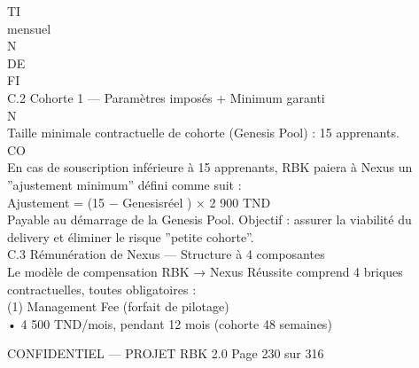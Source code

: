 \documentclass[12pt,landscape,a4paper]{article}
\newenvironment{confidential}
{\begin{tcolorbox}[
    colback=rbkred!5!white,
    colframe=rbkred!75!black,
    title=CONFIDENTIEL,
    fonttitle=\bfseries\color{white},
    coltitle=rbkred!75!black,
    breakable,
    enhanced,
    frame hidden,
    borderline west={2pt}{0pt}{rbkred!75!black}
]}
{\end{tcolorbox}}
\begin{document}
\vspace{0.5em}
\vspace{0.5em}
\vspace{0.5em}
\vspace{0.5em}
TI\\
mensuel\\
\vspace{0.5em}
\vspace{0.5em}
\vspace{0.5em}
\vspace{0.5em}
N\\
DE\\
FI\\
C.2 Cohorte 1 — Paramètres imposés + Minimum garanti\\
\vspace{0.5em}
\vspace{0.5em}
N\\
Taille minimale contractuelle de cohorte (Genesis Pool) : 15 apprenants.\\
CO\\
En cas de souscription inférieure à 15 apprenants, RBK paiera à Nexus un ”ajustement minimum” défini comme suit :\\
\vspace{0.5em}
\vspace{0.5em}
Ajustement = (15 − Genesisréel ) × 2 900 TND\\
\vspace{0.5em}
Payable au démarrage de la Genesis Pool. Objectif : assurer la viabilité du delivery et éliminer le risque ”petite cohorte”.\\
\vspace{0.5em}
\vspace{0.5em}
\vspace{0.5em}
C.3 Rémunération de Nexus — Structure à 4 composantes\\
Le modèle de compensation RBK → Nexus Réussite comprend 4 briques contractuelles, toutes obligatoires :\\
(1) Management Fee (forfait de pilotage)\\
\vspace{0.5em}
• 4 500 TND/mois, pendant 12 mois (cohorte 48 semaines)\\
\vspace{0.5em}
\vspace{0.5em}
\begin{confidential}CONFIDENTIEL — PROJET RBK 2.0                                            Page 230 sur 316\end{confidential}
\end{document}
